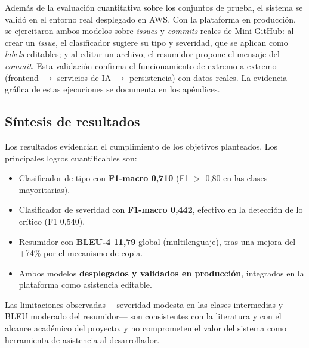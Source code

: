Además de la evaluación cuantitativa sobre los conjuntos de prueba, el sistema se validó en el entorno real desplegado en AWS. Con la plataforma en producción, se ejercitaron ambos modelos sobre \textit{issues} y \textit{commits} reales de Mini-GitHub: al crear un \textit{issue}, el clasificador sugiere su tipo y severidad, que se aplican como \textit{labels} editables; y al editar un archivo, el resumidor propone el mensaje del \textit{commit}. Esta validación confirma el funcionamiento de extremo a extremo (frontend $\rightarrow$ servicios de \acrshort{IA} $\rightarrow$ persistencia) con datos reales. La evidencia gráfica de estas ejecuciones se documenta en los apéndices.

\subsection{Síntesis de resultados}

Los resultados evidencian el cumplimiento de los objetivos planteados. Los principales logros cuantificables son:

\begin{itemize}\itemsep=1pt
    \item Clasificador de tipo con \textbf{F1-macro 0{,}710} (F1 $>$ 0{,}80 en las clases mayoritarias).
    \item Clasificador de severidad con \textbf{F1-macro 0{,}442}, efectivo en la detección de lo crítico (F1 0{,}540).
    \item Resumidor con \textbf{BLEU-4 11{,}79} global (multilenguaje), tras una mejora del +74\% por el mecanismo de copia.
    \item Ambos modelos \textbf{desplegados y validados en producción}, integrados en la plataforma como asistencia editable.
\end{itemize}

Las limitaciones observadas —severidad modesta en las clases intermedias y \acrshort{BLEU} moderado del resumidor— son consistentes con la literatura y con el alcance académico del proyecto, y no comprometen el valor del sistema como herramienta de asistencia al desarrollador.
